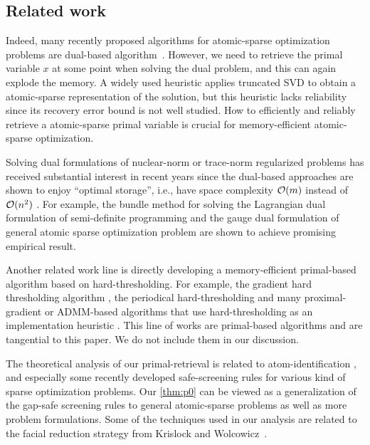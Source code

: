 \subsection{Related work}

Indeed, many recently proposed algorithms for atomic-sparse optimization problems are dual-based algorithm~\cite{fan2019bundle,DingYCTU21}.  However, we need to retrieve the primal variable $x$ at some point when solving the dual problem, and this can again explode the memory. A widely used heuristic applies truncated SVD \cite[Algorithm~6.4]{fan2019alignment} to obtain a atomic-sparse representation of the solution, but this heuristic lacks reliability since its recovery error bound is not well studied. How to efficiently and reliably retrieve a atomic-sparse primal variable is crucial for memory-efficient atomic-sparse optimization.

Solving dual formulations of nuclear-norm or trace-norm regularized problems has received substantial interest in recent years since the dual-based approaches are shown to enjoy ``optimal storage'', i.e., have space complexity $\mathcal{O}(m)$ instead of $\mathcal{O}( n^2 )$ \cite{DingYCTU21}. For example, the bundle method for solving the Lagrangian dual formulation of semi-definite programming \cite{helmberg2000spectral} and the gauge dual formulation of general atomic sparse optimization problem \cite{fan2019bundle} are shown to achieve promising empirical result.

Another related work line is directly developing a memory-efficient primal-based algorithm based on hard-thresholding. For example, the gradient hard thresholding algorithm \cite{YuanLZ17}, the periodical hard-thresholding \cite{Allen-ZhuHHL17} and many proximal-gradient or ADMM-based algorithms that use hard-thresholding as an implementation heuristic \cite{mazumder2010spectral,Lin11,hsieh2014nuclear}. This line of works are primal-based algorithms and are tangential to this paper. We do not include them in our discussion. 

The theoretical analysis of our primal-retrieval is related to atom-identification \cite{BurM88,hare2004identifying,hare2011identifying}, and especially some recently developed safe-screening rules \cite{Ghaoui12,wang2013lasso,liu2014safe,WangZLWY14,Raj2015ScreeningRF,BonnefoyERG15,XiangWR17,NdiayeFGS17,ZhangHLYCHW17,kuang2017screening,Atamtrk2020SafeSR,Bao20} for various kind of sparse optimization problems. Our \autoref{thm:p0} can be viewed as a generalization of the gap-safe screening rules to general atomic-sparse problems as well as more problem formulations. Some of the techniques used in our analysis are related to the facial reduction strategy from Krislock and Wolcowicz~\cite{krislock2010explicit}. 


